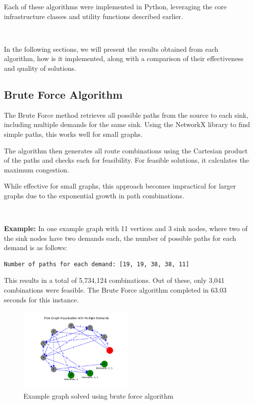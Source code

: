 \documentclass[a4paper,12pt]{article}
\begin{document}
\noindent Each of these algorithms were implemented in Python, leveraging the core infrastructure classes and utility functions described earlier.

\

\noindent  In the following sections, we will present the results obtained from each algorithm, how is it implemented, along with a comparison of their effectiveness and quality of solutions.

\subsection{Brute Force Algorithm}

The Brute Force method retrieves all possible paths from the source to each sink, including multiple demands for the same sink. Using the NetworkX library to find simple paths, this works well for small graphs.

\noindent The algorithm then generates all route combinations using the Cartesian product of the paths and checks each for feasibility. For feasible solutions, it calculates the maximum congestion.

\noindent While effective for small graphs, this approach becomes impractical for larger graphs due to the exponential growth in path combinations.

\

\noindent \textbf{Example:}
In one example graph with 11 vertices and 3 sink nodes, where two of the sink nodes have two demands each, the number of possible paths for each demand is as follows:

\begin{verbatim}
Number of paths for each demand: [19, 19, 38, 38, 11]
\end{verbatim}

\noindent This results in a total of 5,734,124 combinations. Out of these, only 3,041 combinations were feasible. The Brute Force algorithm completed in 63.03 seconds for this instance.

\begin{figure}[H]
    \centering
    \includegraphics[width=0.5\textwidth]{brute-force-example.png}
    \caption{Example graph solved using brute force algorithm}
\end{figure}
\end{document}
